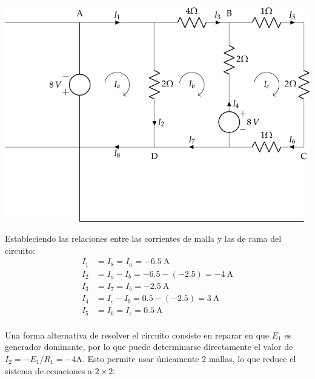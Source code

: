 \documentclass[10pt]{article}
\begin{document}
\vspace{-10mm}
\begin{center}
  \includegraphics[scale=1.1]{figs/BT1_11_mod.pdf}
\end{center}

\vspace{2mm}
Estableciendo las relaciones entre las corrientes de malla y las de rama del circuito:
\begin{align*}
  I_1&=I_8=I_a= \boxed{\qty{-6.5}{\ampere}}\\
  I_2&=I_a-I_b=-6.5-(-2.5)= \boxed{\qty{-4}{\ampere}}\\
  I_3&=I_7=I_b= \boxed{\qty{-2.5}{\ampere}}\\
  I_4&=I_c-I_b=0.5-(-2.5)= \boxed{\qty{3}{\ampere}}\\
  I_5&=I_6=I_c= \boxed{\qty{0.5}{\ampere}}\\
\end{align*}

\vspace{-2mm}
Una forma alternativa de resolver el circuito consiste en reparar en que $E_1$ es generador dominante, por lo que puede determinarse directamente el valor de $I_2 = - E_1 / R_1 = -4\si{\ampere}$. Esto permite usar únicamente 2 mallas, lo que reduce el sistema de ecuaciones a $2\times 2$: 
\end{document}
